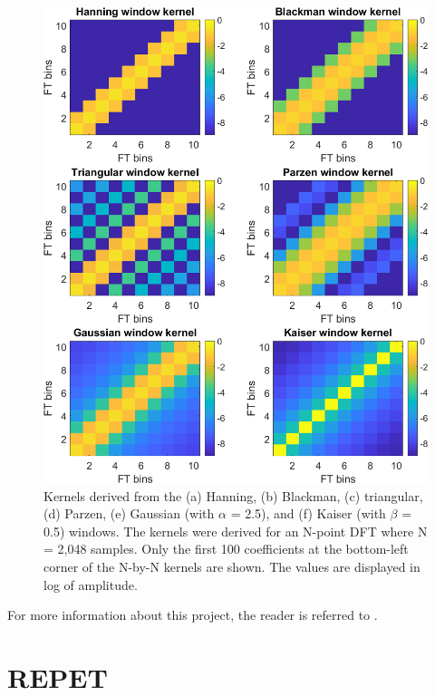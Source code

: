 \documentclass{article}
\begin{document}
\begin{figure}[!htb]
\centering
\includegraphics[width=\columnwidth]{Images/kernels.png}
\caption{Kernels derived from the (a) Hanning, (b) Blackman, (c) triangular, (d) Parzen, (e) Gaussian (with $\alpha$ = 2.5), and (f) Kaiser (with $\beta$ = 0.5) windows. The kernels were derived for an N-point DFT where N = 2,048 samples. Only the first 100 coefficients at the bottom-left corner of the N-by-N kernels are shown. The values are displayed in log of amplitude.}
\label{fig:kernels}
\end{figure}

For more information about this project, the reader is referred to \cite{article_rafii_nov2018}.


\section{REPET}
\label{sec:repet}
\end{document}
